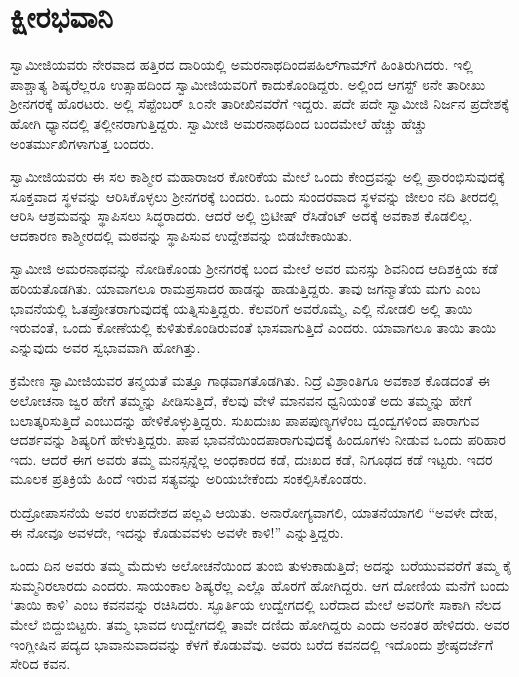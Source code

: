 
\chapter{ಕ್ಷೀರಭವಾನಿ}

 ಸ್ವಾಮೀಜಿಯವರು ನೇರವಾದ ಹತ್ತಿರದ ದಾರಿಯಲ್ಲಿ ಅಮರನಾಥದಿಂದ\break ಪಹಿಲ್‍ಗಾಮ್‍ಗೆ ಹಿಂತಿರುಗಿದರು. ಇಲ್ಲಿ ಪಾಶ್ಚಾತ್ಯ ಶಿಷ್ಯರೆಲ್ಲರೂ ಉತ್ಸಾಹದಿಂದ ಸ್ವಾಮೀಜಿಯವರಿಗೆ ಕಾದುಕೊಂಡಿದ್ದರು. ಅಲ್ಲಿಂದ ಆಗಸ್ಟ್ ೮ನೇ ತಾರೀಖು ಶ‍್ರೀನಗರಕ್ಕೆ ಹೊರಟರು. ಅಲ್ಲಿ ಸೆಪ್ಟೆಂಬರ್ ೩೦ನೇ ತಾರೀಖಿನವರೆಗೆ ಇದ್ದರು. ಪದೇ ಪದೇ ಸ್ವಾಮೀಜಿ ನಿರ್ಜನ ಪ್ರದೇಶಕ್ಕೆ ಹೋಗಿ ಧ್ಯಾನದಲ್ಲಿ ತಲ್ಲೀನರಾಗುತ್ತಿದ್ದರು. ಸ್ವಾಮೀಜಿ ಅಮರನಾಥದಿಂದ ಬಂದಮೇಲೆ ಹೆಚ್ಚು ಹೆಚ್ಚು ಅಂತರ್ಮುಖಿಗಳಾಗುತ್ತ ಬಂದರು. 

 ಸ್ವಾಮೀಜಿಯವರು ಈ ಸಲ ಕಾಶ್ಮೀರ ಮಹಾರಾಜರ ಕೋರಿಕೆಯ ಮೇಲೆ ಒಂದು ಕೇಂದ್ರವನ್ನು ಅಲ್ಲಿ ಪ್ರಾರಂಭಿಸುವುದಕ್ಕೆ ಸೂಕ್ತವಾದ ಸ್ಥಳವನ್ನು ಆರಿಸಿಕೊಳ್ಳಲು ಶ‍್ರೀನಗರಕ್ಕೆ ಬಂದರು. ಒಂದು ಸುಂದರವಾದ ಸ್ಥಳವನ್ನು ಜೀಲಂ ನದಿ ತೀರದಲ್ಲಿ ಆರಿಸಿ ಆಶ್ರಮವನ್ನು ಸ್ಥಾಪಿಸಲು ಸಿದ್ಧರಾದರು. ಆದರೆ ಅಲ್ಲಿ ಬ್ರಿಟೀಷ್ ರೆಸಿಡೆಂಟ್ ಅದಕ್ಕೆ ಅವಕಾಶ ಕೊಡಲಿಲ್ಲ. ಆದಕಾರಣ ಕಾಶ್ಮೀರದಲ್ಲಿ ಮಠವನ್ನು ಸ್ಥಾಪಿಸುವ ಉದ್ದೇಶವನ್ನು ಬಿಡಬೇಕಾಯಿತು. 

 ಸ್ವಾಮೀಜಿ ಅಮರನಾಥವನ್ನು ನೋಡಿಕೊಂಡು ಶ‍್ರೀನಗರಕ್ಕೆ ಬಂದ ಮೇಲೆ ಅವರ ಮನಸ್ಸು ಶಿವನಿಂದ ಆದಿಶಕ್ತಿಯ ಕಡೆ ಹರಿಯತೊಡಗಿತು. ಯಾವಾಗಲೂ ರಾಮಪ್ರಸಾದರ ಹಾಡನ್ನು ಹಾಡುತ್ತಿದ್ದರು. ತಾವು ಜಗನ್ಮಾತೆಯ ಮಗು ಎಂಬ ಭಾವನೆಯಲ್ಲಿ ಓತಪ್ರೋತರಾಗುವುದಕ್ಕೆ ಯತ್ನಿಸುತ್ತಿದ್ದರು. ಕೆಲವರಿಗೆ ಅವರೊಮ್ಮೆ, ಎಲ್ಲಿ ನೋಡಲಿ ಅಲ್ಲಿ ತಾಯಿ ಇರುವಂತೆ, ಒಂದು ಕೋಣೆಯಲ್ಲಿ ಕುಳಿತುಕೊಂಡಿರುವಂತೆ ಭಾಸವಾಗುತ್ತಿದೆ ಎಂದರು. ಯಾವಾಗಲೂ ತಾಯಿ ತಾಯಿ ಎನ್ನುವುದು ಅವರ ಸ್ವಭಾವವಾಗಿ ಹೋಗಿತ್ತು. 

 ಕ್ರಮೇಣ ಸ್ವಾಮೀಜಿಯವರ ತನ್ಮಯತೆ ಮತ್ತೂ ಗಾಢವಾಗತೊಡಗಿತು. ನಿದ್ರೆ ವಿಶ್ರಾಂತಿಗೂ ಅವಕಾಶ ಕೊಡದಂತೆ ಈ ಅಲೋಚನಾ ಜ್ವರ ಹೇಗೆ ತಮ್ಮನ್ನು ಪೀಡಿಸುತ್ತಿದೆ, ಕೆಲವು ವೇಳೆ ಮಾನವನ ಧ್ವನಿಯಂತೆ ಅದು ತಮ್ಮನ್ನು ಹೇಗೆ ಬಲಾತ್ಕರಿಸುತ್ತಿದೆ ಎಂಬುದನ್ನು ಹೇಳಿಕೊಳ್ಳುತ್ತಿದ್ದರು. ಸುಖದುಃಖ ಪಾಪಪುಣ್ಯಗಳೆಂಬ ದ್ವಂದ್ವಗಳಿಂದ ಪಾರಾಗುವ ಆದರ್ಶವನ್ನು ಶಿಷ್ಯರಿಗೆ ಹೇಳುತ್ತಿದ್ದರು. ಪಾಪ ಭಾವನೆಯಿಂದ\break ಪಾರಾಗುವುದಕ್ಕೆ ಹಿಂದೂಗಳು ನೀಡುವ ಒಂದು ಪರಿಹಾರ ಇದು. ಆದರೆ ಈಗ ಅವರು ತಮ್ಮ ಮನಸ್ಸನ್ನೆಲ್ಲ ಅಂಧಕಾರದ ಕಡೆ, ದುಃಖದ ಕಡೆ, ನಿಗೂಢದ ಕಡೆ ಇಟ್ಟರು. ಇದರ ಮೂಲಕ ಪ್ರತಿಕ್ರಿಯೆ ಹಿಂದೆ ಇರುವ ಸತ್ಯವನ್ನು ಅರಿಯಬೇಕೆಂದು ಸಂಕಲ್ಪಿಸಿಕೊಂಡರು. 

 ರುದ್ರೋಪಾಸನೆಯೆ ಅವರ ಉಪದೇಶದ ಪಲ್ಲವಿ ಆಯಿತು. ಅನಾರೋಗ್ಯವಾಗಲಿ, ಯಾತನೆಯಾಗಲಿ “ಅವಳೇ ದೇಹ, ಈ ನೋವೂ ಅವಳದೇ, ಇದನ್ನು ಕೊಡುವವಳು ಅವಳೇ ಕಾಳಿ!” ಎನ್ನುತ್ತಿದ್ದರು. 

 ಒಂದು ದಿನ ಅವರು ತಮ್ಮ ಮೆದುಳು ಅಲೋಚನೆಯಿಂದ ತುಂಬಿ ತುಳುಕಾಡುತ್ತಿದೆ; ಅದನ್ನು ಬರೆಯುವವರೆಗೆ ತಮ್ಮ ಕೈ ಸುಮ್ಮನಿರಲಾರದು ಎಂದರು. ಸಾಯಂಕಾಲ ಶಿಷ್ಯರೆಲ್ಲ ಎಲ್ಲೊ ಹೊರಗೆ ಹೋಗಿದ್ದರು. ಆಗ ದೋಣಿಯ ಮನೆಗೆ ಬಂದು ‘ತಾಯಿ ಕಾಳಿ’ ಎಂಬ ಕವನವನ್ನು ರಚಿಸಿದರು. ಸ್ಫೂರ್ತಿಯ ಉದ್ವೇಗದಲ್ಲಿ ಬರೆದಾದ ಮೇಲೆ ಅವರಿಗೇ ಸಾಕಾಗಿ ನೆಲದ ಮೇಲೆ ಬಿದ್ದುಬಿಟ್ಟರು. ತಮ್ಮ ಭಾವದ ಉದ್ವೇಗದಲ್ಲಿ ತಾವೇ ದಣಿದು ಹೋಗಿದ್ದರು ಎಂದು ಅನಂತರ ಹೇಳಿದರು. ಅವರ ಇಂಗ್ಲೀಷಿನ ಪದ್ಯದ ಭಾವಾನುವಾದವನ್ನು ಕೆಳಗೆ ಕೊಡುವೆವು. ಅವರು ಬರೆದ ಕವನದಲ್ಲಿ ಇದೊಂದು ಶ್ರೇಷ್ಠದರ್ಜೆಗೆ ಸೇರಿದ ಕವನ.

